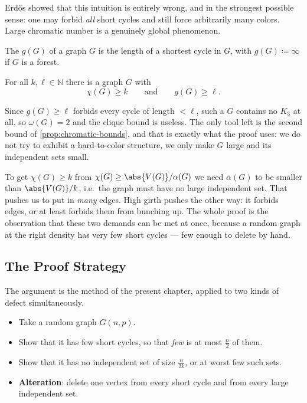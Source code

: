 Erd\H{o}s showed that this intuition is entirely wrong, and in the strongest possible sense: one may forbid \emph{all} short cycles and still force arbitrarily many colors. Large chromatic number is a genuinely global phenomenon.

\begin{definition}[Girth]\label{def:girth}
    The  \(g(G)\) of a graph \(G\) is the length of a shortest cycle in \(G\), with \(g(G) \coloneqq \infty\) if \(G\) is a forest.
\end{definition}

\begin{theorem}[Erd\H{o}s, 1959]\label{thm:erdos-girth}
    For all \(k, \ell \in \mathbb{N}\) there is a graph \(G\) with
    \[
        \chi(G) \ge k
        \qquad\text{and}\qquad
        g(G) \ge \ell.
    \]
\end{theorem}

Since \(g(G) \ge \ell\) forbids every cycle of length \(< \ell\), such a \(G\) contains no \(K_3\) at all, so \(\omega(G) = 2\) and the clique bound is useless. The only tool left is the second bound of \autoref{prop:chromatic-bounds}, and that is exactly what the proof uses: we do not try to exhibit a hard-to-color structure, we only make \(G\) large and its independent sets small.

\begin{intuition}
    To get \(\chi(G) \ge k\) from \(\chi(G) \ge \abs{V(G)}/\alpha(G)\) we need \(\alpha(G)\) to be smaller than \(\abs{V(G)}/k\), i.e.\ the graph must have no large independent set. That pushes us to put in \emph{many} edges. High girth pushes the other way: it forbids edges, or at least forbids them from bunching up. The whole proof is the observation that these two demands can be met at once, because a random graph at the right density has very few short cycles --- few enough to delete by hand.
\end{intuition}

\subsection{The Proof Strategy}

The argument is the method of the present chapter, applied to two kinds of defect simultaneously.

\begin{itemize}
    \item Take a random graph \(G(n,p)\).
    \item Show that it has few short cycles, so that \emph{few} is at most \(\frac{n}{2}\) of them.
    \item Show that it has no independent set of size \(\frac{n}{2k}\), or at worst few such sets.
    \item \textbf{Alteration}: delete one vertex from every short cycle and from every large independent set.
\end{itemize}

